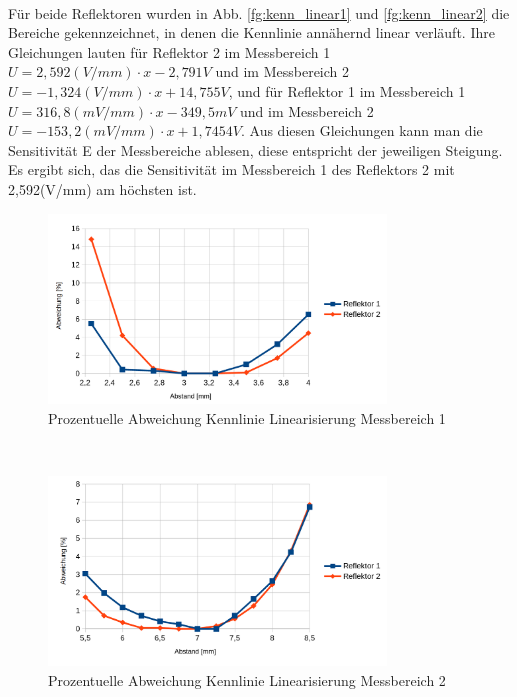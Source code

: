 ~\\
Für beide Reflektoren wurden in Abb. \ref{fg:kenn_linear1} und \ref{fg:kenn_linear2} die Bereiche gekennzeichnet, in denen die Kennlinie annähernd linear verläuft. Ihre Gleichungen lauten für Reflektor 2 im Messbereich 1 $U = 2,592(V/mm) \cdot x - 2,791V$ und im Messbereich 2 $U = -1,324(V/mm) \cdot x + 14,755V$, und für Reflektor 1 im Messbereich 1 $U = 316,8(mV/mm) \cdot x - 349,5mV$ und im Messbereich 2 $U = -153,2(mV/mm) \cdot x + 1,7454V$. Aus diesen Gleichungen kann man die Sensitivität E der Messbereiche ablesen, diese entspricht der jeweiligen Steigung. Es ergibt sich, das die Sensitivität im Messbereich 1 des Reflektors 2 mit 2,592(V/mm) am höchsten ist.
\begin{figure}[h]
	\centering
	\includegraphics[width=0.8\textwidth]{./img/Prozentuelle_Abweichung_Kennlinie_Linearisierung_Messbereich_1}
	\caption{Prozentuelle Abweichung Kennlinie Linearisierung Messbereich 1}
	\label{fg:kenn_mb1}
\end{figure}
~\\
\begin{figure}[h]
	\centering
	\includegraphics[width=0.8\textwidth]{./img/Prozentuelle_Abweichung_Kennlinie_Linearisierung_Messbereich_2}
	\caption{Prozentuelle Abweichung Kennlinie Linearisierung Messbereich 2}
	\label{fg:kenn_mb2}
\end{figure}
~\\
